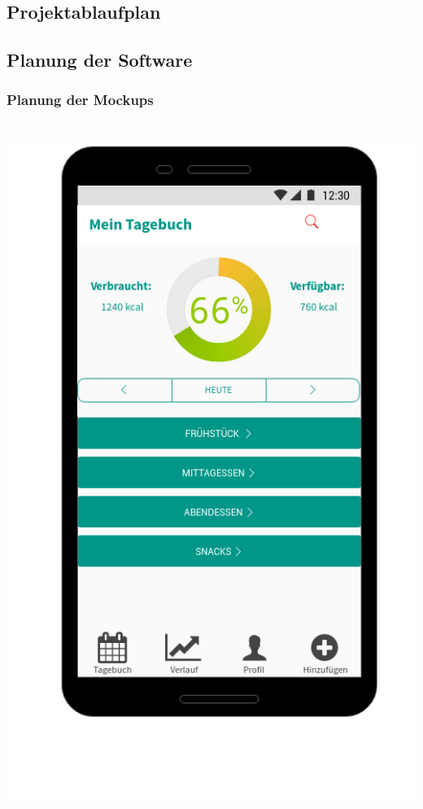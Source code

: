 \subsection{Projektablaufplan}

\subsection{Planung der Software}

\subsubsection{Planung der Mockups}\\

\includegraphics[scale=0.3]{img/mockup.png}\\


